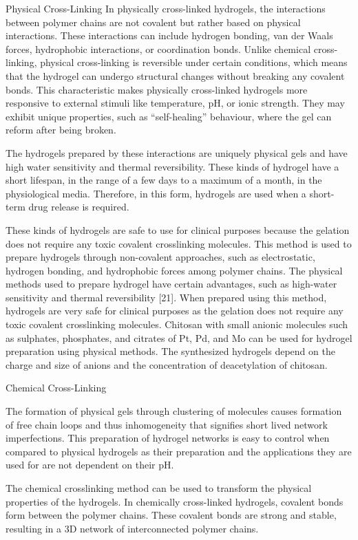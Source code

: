 \documentclass[../../main-notes.tex]{subfiles}
\begin{document}
Physical Cross-Linking
In physically cross-linked hydrogels, the interactions between polymer chains are not covalent but rather based on physical interactions. 
These interactions can include hydrogen bonding, van der Waals forces, hydrophobic interactions, or coordination bonds. 
Unlike chemical cross-linking, physical cross-linking is reversible under certain conditions, which means that the hydrogel can undergo structural changes without breaking any covalent bonds. 
This characteristic makes physically cross-linked hydrogels more responsive to external stimuli like temperature, pH, or ionic strength. 
They may exhibit unique properties, such as “self-healing” behaviour, where the gel can reform after being broken. 

The hydrogels prepared by these interactions are uniquely physical gels and have high water sensitivity and thermal reversibility. 
These kinds of hydrogel have a short lifespan, in the range of a few days to a maximum of a month, in the physiological media. 
Therefore, in this form, hydrogels are used when a short-term drug release is required. 

These kinds of hydrogels are safe to use for clinical purposes because the gelation does not require any toxic covalent crosslinking molecules. 
This method is used to prepare hydrogels through non-covalent approaches, such as electrostatic, hydrogen bonding, and hydrophobic forces among polymer chains. 
The physical methods used to prepare hydrogel have certain advantages, such as high-water sensitivity and thermal reversibility [21]. 
When prepared using this method, hydrogels are very safe for clinical purposes as the gelation does not require any toxic covalent crosslinking molecules. 
Chitosan with small anionic molecules such as sulphates, phosphates, and citrates of Pt, Pd, and Mo can be used for hydrogel preparation using physical methods. 
The synthesized hydrogels depend on the charge and size of anions and the concentration of deacetylation of chitosan.


Chemical Cross-Linking

The formation of physical gels through clustering of molecules causes formation of free chain loops and thus inhomogeneity that signifies short lived network imperfections. 
This preparation of hydrogel networks is easy to control when compared to physical hydrogels as their preparation and the applications they are used for are not dependent on their pH. 

The chemical crosslinking method can be used to transform the physical properties of the hydrogels. 
In chemically cross-linked hydrogels, covalent bonds form between the polymer chains.
These covalent bonds are strong and stable, resulting in a 3D network of interconnected polymer chains. 
\end{document}
